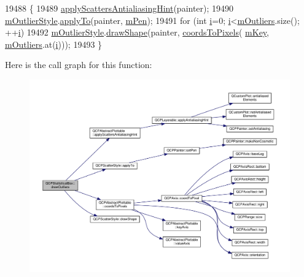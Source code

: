 \begin{DoxyCode}
19488 \{
19489   \hyperlink{class_q_c_p_abstract_plottable_a753272ee225a62827e90c3e1e78de4b1}{applyScattersAntialiasingHint}(painter);
19490   \hyperlink{class_q_c_p_statistical_box_ae102e4187e1e6ba1f2df0f622b5171a4}{mOutlierStyle}.\hyperlink{class_q_c_p_scatter_style_a81817dfd404635f211e6ff2a04657d36}{applyTo}(painter, \hyperlink{class_q_c_p_abstract_plottable_a67bc0622fd1b9fa14e54c14922dcec66}{mPen});
19491   \textcolor{keywordflow}{for} (\textcolor{keywordtype}{int} \hyperlink{_comparision_pictures_2_createtest_image_8m_a6f6ccfcf58b31cb6412107d9d5281426}{i}=0; \hyperlink{_comparision_pictures_2_createtest_image_8m_a6f6ccfcf58b31cb6412107d9d5281426}{i}<\hyperlink{class_q_c_p_statistical_box_a415e2f77a89396c2af999afe027bdf6c}{mOutliers}.size(); ++\hyperlink{_comparision_pictures_2_createtest_image_8m_a6f6ccfcf58b31cb6412107d9d5281426}{i})
19492     \hyperlink{class_q_c_p_statistical_box_ae102e4187e1e6ba1f2df0f622b5171a4}{mOutlierStyle}.\hyperlink{class_q_c_p_scatter_style_a992d531ac471ec2b29bdec6aeb400a06}{drawShape}(painter, \hyperlink{class_q_c_p_abstract_plottable_ade710a776104b14c1c835168ce1bfc5c}{coordsToPixels}(
      \hyperlink{class_q_c_p_statistical_box_a86fd1d3be5c5bc11d11eda7517069af4}{mKey}, \hyperlink{class_q_c_p_statistical_box_a415e2f77a89396c2af999afe027bdf6c}{mOutliers}.at(\hyperlink{_comparision_pictures_2_createtest_image_8m_a6f6ccfcf58b31cb6412107d9d5281426}{i})));
19493 \}
\end{DoxyCode}


Here is the call graph for this function\+:\nopagebreak
\begin{figure}[H]
\begin{center}
\leavevmode
\includegraphics[width=350pt]{class_q_c_p_statistical_box_a60ebb332a497f51ace837767db5105b9_cgraph}
\end{center}
\end{figure}




